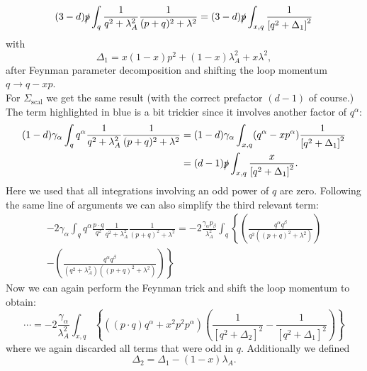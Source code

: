 \documentclass[digital, %
			   openright, %
			   parskip=half,
			   11pt]{mythesis}
\begin{document}
\begin{equation}
	(3-d)\slashed{p} \int_q \frac{1}{q^2 + \lambda_A^2}\frac{1}{(p+q)^2 + \lambda^2} = (3-d)\slashed{p}\int_{x,q} \frac{1}{\left[q^2 + \Delta_1\right]^2}
\end{equation}
with 
\begin{equation}
	\Delta_1 = x(1-x)p^2 + (1-x)\lambda_A^2 + x\lambda^2,
\end{equation}
after Feynman parameter decomposition and shifting the loop momentum $q \rightarrow q-xp$.\\
For $\Sigma_{\mathrm{scal}}$ we get the same result (with the correct prefactor $(d-1)$ of course.) The term highlighted in blue is a bit trickier since it involves another factor of $q^{\alpha}$: 
\begin{equation}
\begin{aligned}
	(1-d)\gamma_{\alpha} \int_q q^{\alpha} \frac{1}{q^2 + \lambda_A^2}\frac{1}{(p+q)^2 + \lambda^2} &= (1-d)\gamma_{\alpha}\int_{x,q} (q^{\alpha} - xp^{\alpha})\frac{1}{\left[q^2 + \Delta_1\right]^2}\\
	&= (d-1)\slashed{p}\int_{x,q}\frac{x}{\left[q^2 + \Delta_1\right]^2}.
	\end{aligned}
\end{equation}
Here we used that all integrations involving an odd power of $q$ are zero. Following the same line of arguments we can also simplify the third relevant term:
\begin{equation}
	\begin{aligned}
		-2\gamma_{\alpha} \int_q q^{\alpha}\frac{p\cdot q}{q^2} \frac{1}{q^2 + \lambda_A^2}\frac{1}{(p+q)^2 + \lambda^2} = -2\frac{\gamma_{\alpha}p_{\beta}}{\lambda_A^2}\int_q\left\{\left(\frac{ q^{\alpha}q^{\beta}}{q^2 ((p+q)^2 + \lambda^2)}\right)\right.\\ \left. - \left(\frac{ q^{\alpha}q^{\beta}}{(q^2 + \lambda_A^2)((p+q)^2 + \lambda^2)}\right)\right\}
	\end{aligned}
\end{equation}
Now we can again perform the Feynman trick and shift the loop momentum to obtain:
\begin{equation}
	\cdots = -2\frac{\gamma_{\alpha}}{\lambda_A^2}\int_{x,q}\left\{ \left((p\cdot q)q^{\alpha} + x^2p^2p^{\alpha}\right)\left(\frac{1}{\left[q^2 + \Delta_2\right]^2} - \frac{1}{\left[q^2 + \Delta_1\right]^2}\right) \right\}
\end{equation}
where we again discarded all terms that were odd in $q$. Additionally we defined
\begin{equation}
	\Delta_2 = \Delta_1 - (1-x)\lambda_A.
\end{equation}
\end{document}
